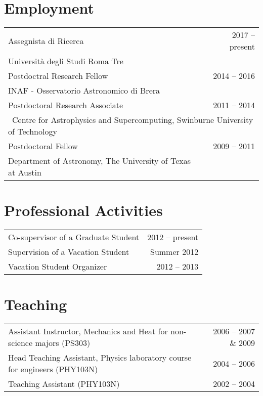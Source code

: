 \section*{Employment}

\hspace{0.05in}
\begin{tabular*}{159.2mm}{@{\extracolsep{\fill}}lr}
  Assegnista di Ricerca& 2017 -- present\\
  \quad Universit\`{a} degli Studi Roma Tre\\
  Postdoctral Research Fellow & 2014 -- 2016\\
  \quad INAF - Osservatorio Astronomico di Brera\\
  Postdoctoral Research Associate & 2011 -- 2014\\
  \multicolumn{2}{l}{\, Centre for Astrophysics and Supercomputing, Swinburne University of Technology}\\
  Postdoctoral Fellow & 2009 -- 2011\\
  \quad Department of Astronomy, The University of Texas at Austin
\end{tabular*}

\section*{Professional Activities}

\hspace{0.05in}
\begin{tabular*}{159.2mm}{@{\extracolsep{\fill}}lr}
Co-supervisor of a Graduate Student & 2012 -- present\\
Supervision of a Vacation Student & Summer 2012\\
Vacation Student Organizer & 2012 -- 2013\\
\end{tabular*}

\section*{Teaching}

\hspace{0.05in}
\begin{tabular*}{159.2mm}{@{\extracolsep{\fill}}lr}
  Assistant Instructor, Mechanics and Heat for non-science majors (PS303) & 2006 -- 2007 \& 2009\\
  Head Teaching Assistant, Physics laboratory course for engineers (PHY103N) & 2004 -- 2006\\
  Teaching Assistant (PHY103N) & 2002 -- 2004
\end{tabular*}

